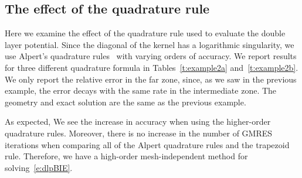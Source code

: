 \documentclass[final]{siamltex}
\begin{document}
\subsection*{The effect of the quadrature rule}

Here we examine the effect of the quadrature rule used to evaluate the
double layer potential.  Since the diagonal of the kernel has a
logarithmic singularity, we use Alpert's quadrature rules~\cite{alpert}
with varying orders of accuracy.  We report results for three different
quadrature formula in Tables~\ref{t:example2a} and~\ref{t:example2b}.
We only report the relative error in the far zone, since, as we saw in
the previous example, the error decays with the same rate in the
intermediate zone.  The geometry and exact solution are the same as the
previous example.

As expected, We see the increase in accuracy when using the higher-order
quadrature rules.  Moreover, there is no increase in the number of GMRES
iterations when comparing all of the Alpert quadrature rules and the
trapezoid rule.  Therefore, we have a high-order mesh-independent method
for solving~\eqref{e:dlpBIE}.
\end{document}
